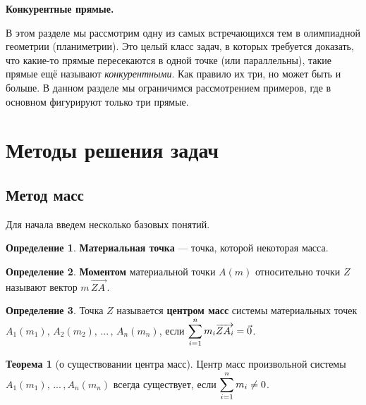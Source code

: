 \documentclass[14pt]{extarticle}
\let\Overrightarrow\overrightarrow
\theoremstyle{definition}
\newtheorem*{definition}{Определение}
\theoremstyle{theorem}
\newtheorem*{theorem}{Теорема}
\begin{document}
\begin{center}
	\textbf{\fontsize{23}{30}\selectfont Конкурентные прямые.}
\end{center}


В этом разделе мы рассмотрим одну из самых встречающихся тем 
в олимпиадной геометрии (планиметрии). Это целый класс
задач, в которых требуется доказать, что какие-то
прямые пересекаются в одной точке (или параллельны), такие прямые ещё называют
\textit{конкурентными}. Как правило их три, но может быть и больше.
В данном разделе мы ограничимся рассмотрением примеров,
где в основном фигурируют только три прямые.\\


\section*{Методы решения задач}

\subsection{Метод масс}
Для начала введем несколько базовых понятий.

\begin{definition}
\noindent \textbf{Материальная точка} --- точка, которой 
 некоторая масса.
\end{definition}

\begin{definition}
\noindent \textbf{Моментом} материальной точки $A(m)$ относительно 
точки $Z$ называют вектор $m \, \Overrightarrow{ZA_{\,}}$.
\end{definition}

\begin{definition}
\noindent Точка $Z$ называется \textbf{центром масс} системы материальных точек\\
$A_1(m_1), \, A_2(m_2), \, ... \, , \, A_n(m_n)$, 
если $\mathlarger{\sum_{i=1}^{n} m_i \Overrightarrow{ZA_i} = \vec{0}}$.
\end{definition}


\begin{theorem}[о существовании центра масс]
	Центр масс произвольной системы $A_1(m_1), \, ... \, ,A_n(m_n)$
	всегда существует, если $\mathlarger{\sum_{i=1}^{n} m_i \ne 0}$.
\end{theorem}
\end{document}
